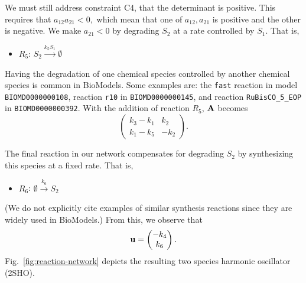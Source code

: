 \documentclass{bmcart}
\newcommand{\fig}[1]{Fig.~\ref{#1}}
\begin{document}
We must still address constraint C4, that the determinant is positive. This requires that $a_{12} a_{21} < 0,$ which mean that one of $a_{12}, a_{21}$ is positive and the other is negative. We make $a_{21} < 0$ by degrading $S_2$ at a rate controlled by $S_1$.
That is,
\begin{itemize}
    \item $R_5$: $S_2 \xrightarrow{k_5 S_1}\emptyset$
\end{itemize}
Having the degradation of one chemical species controlled by another chemical species is common in BioModels. Some examples are: the {\tt fast} reaction in model {\tt BIOMD0000000108}, reaction {\tt r10} in {\tt BIOMD0000000145},
and reaction {\tt RuBisCO\_5\_EOP} in {\tt BIOMD0000000392}. With the addition of reaction $R_5$,
${\bf A}$ becomes
$$\left( \begin{matrix}
     k_3 - k_1 & k_2  \\
     k_1 - k_5 & -k_2
\end{matrix} \right).$$

The final reaction in our network compensates for degrading $S_2$ by synthesizing this species at a fixed rate. That is,
\begin{itemize}
    \item $R_6$: $\emptyset \xrightarrow{k_6} S_2$
\end{itemize}
(We do not explicitly cite examples of similar synthesis reactions since they are widely used in BioModels.)
From this, we observe that 
\begin{equation}
   {\bf u} = \left( \begin{matrix}
       -k_4 \\
       k_6
   \end{matrix} \right). \label{eq:u}
\end{equation}
\fig{fig:reaction-network} depicts the resulting two species harmonic oscillator (2SHO).
\end{document}
